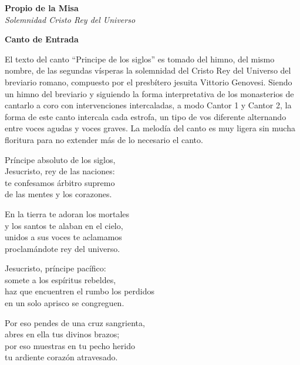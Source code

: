 \documentclass[12pt, letterpaper]{report}
\begin{document}
    \begin{center}
        \vspace*{8cm}
        \textbf{\Huge Propio de la Misa}\\
        \textit{ \Large Solemnidad Cristo Rey del Universo}
    \end{center}
    \clearpage

    \begin{center}
      \LARGE \textbf{Canto de Entrada}
    \end{center}

    \Large El texto del canto ``Principe de los siglos'' es tomado del himno, del mismo nombre, de las segundas v\'isperas la solemnidad del Cristo Rey del Universo del breviario romano, compuesto por el presb\'itero jesuita Vittorio Genovesi. Siendo un himno del breviario y siguiendo la forma interpretativa de los monasterios de cantarlo a coro con intervenciones intercaladas, a modo Cantor 1 y Cantor 2, la forma de este canto intercala cada estrofa, un tipo de vos diferente alternando entre voces agudas y voces graves. La melod\'ia del canto es muy ligera sin mucha floritura para no extender m\'as de lo necesario el canto.

    \noindent
    \LARGE Pr\'incipe absoluto de los siglos,\\
    Jesucristo, rey de las naciones:\\
    te confesamos \'arbitro supremo\\
    de las mentes y los corazones.

    \noindent
    En la tierra te adoran los mortales\\
    y los santos te alaban en el cielo,\\
    unidos a sus voces te aclamamos\\
    proclam\'andote rey del universo.

    \noindent
    Jesucristo, pr\'incipe pac\'ifico:\\
    somete a los esp\'iritus rebeldes,\\
    haz que encuentren el rumbo los perdidos\\
    en un solo aprisco se congreguen.

    \noindent
    Por eso pendes de una cruz sangrienta,\\
    abres en ella tus divinos brazos;\\
    por eso muestras en tu pecho herido\\
    tu ardiente coraz\'on atravesado.
\end{document}
